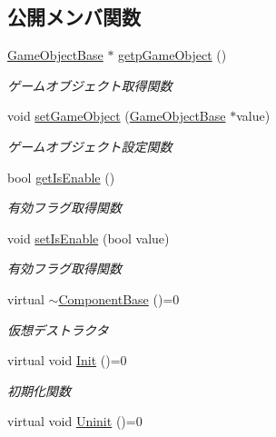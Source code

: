\subsection*{公開メンバ関数}
\begin{DoxyCompactItemize}
\item 
\mbox{\hyperlink{class_game_object_base}{Game\+Object\+Base}} $\ast$ \mbox{\hyperlink{class_component_base_ab9517b92e45e084b1cc450c147e16642}{getp\+Game\+Object}} ()
\begin{DoxyCompactList}\small\item\em ゲームオブジェクト取得関数 \end{DoxyCompactList}\item 
void \mbox{\hyperlink{class_component_base_ae671317076d3c89ba0793ae2cd34d5ea}{set\+Game\+Object}} (\mbox{\hyperlink{class_game_object_base}{Game\+Object\+Base}} $\ast$value)
\begin{DoxyCompactList}\small\item\em ゲームオブジェクト設定関数 \end{DoxyCompactList}\item 
bool \mbox{\hyperlink{class_component_base_a36f289382f4dd0187a6f355e06c5c08e}{get\+Is\+Enable}} ()
\begin{DoxyCompactList}\small\item\em 有効フラグ取得関数 \end{DoxyCompactList}\item 
void \mbox{\hyperlink{class_component_base_aded407119b125a269d272647fc4c4639}{set\+Is\+Enable}} (bool value)
\begin{DoxyCompactList}\small\item\em 有効フラグ取得関数 \end{DoxyCompactList}\item 
virtual \mbox{\hyperlink{class_component_base_a80a37e33ecca2471b2186fba1aaf2cdd}{$\sim$\+Component\+Base}} ()=0
\begin{DoxyCompactList}\small\item\em 仮想デストラクタ \end{DoxyCompactList}\item 
virtual void \mbox{\hyperlink{class_component_base_a125939d6befe42f28886a6523e86b18b}{Init}} ()=0
\begin{DoxyCompactList}\small\item\em 初期化関数 \end{DoxyCompactList}\item 
virtual void \mbox{\hyperlink{class_component_base_a9f42beaf0383d6f629819579cab4de57}{Uninit}} ()=0

\end{DoxyCompactItemize}
